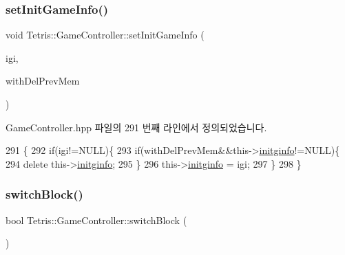 \subsubsection{\texorpdfstring{set\+Init\+Game\+Info()}{setInitGameInfo()}\hspace{0.1cm}{\footnotesize\ttfamily [2/2]}}
{\footnotesize\ttfamily void Tetris\+::\+Game\+Controller\+::set\+Init\+Game\+Info (\begin{DoxyParamCaption}\item[{\hyperlink{class_tetris_1_1_init_game_info}{Init\+Game\+Info} $\ast$}]{igi,  }\item[{bool}]{with\+Del\+Prev\+Mem }\end{DoxyParamCaption})\hspace{0.3cm}{\ttfamily [inline]}}



Game\+Controller.\+hpp 파일의 291 번째 라인에서 정의되었습니다.


\begin{DoxyCode}
291                                                                        \{
292                 \textcolor{keywordflow}{if}(igi!=NULL)\{
293                     \textcolor{keywordflow}{if}(withDelPrevMem&&this->\hyperlink{class_tetris_1_1_game_controller_adaefa9bbdd0d73ec58173dce327373ca}{initginfo}!=NULL)\{
294                         \textcolor{keyword}{delete} this->\hyperlink{class_tetris_1_1_game_controller_adaefa9bbdd0d73ec58173dce327373ca}{initginfo};
295                     \}
296                     this->\hyperlink{class_tetris_1_1_game_controller_adaefa9bbdd0d73ec58173dce327373ca}{initginfo} = igi;
297                 \}
298             \}
\end{DoxyCode}
\mbox{\label{class_tetris_1_1_game_controller_ad203991dc134e2ea36c9c40326da55c1}} 
\subsubsection{\texorpdfstring{switch\+Block()}{switchBlock()}}
{\footnotesize\ttfamily bool Tetris\+::\+Game\+Controller\+::switch\+Block (\begin{DoxyParamCaption}{ }\end{DoxyParamCaption})\hspace{0.3cm}{\ttfamily [inline]}}

